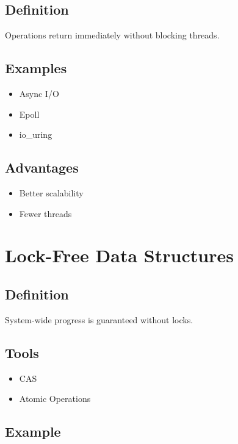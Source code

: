 \subsection{Definition}

Operations return immediately without blocking threads.

\subsection{Examples}

\begin{itemize}
\item Async I/O
\item Epoll
\item io\_uring
\end{itemize}

\subsection{Advantages}

\begin{itemize}
\item Better scalability
\item Fewer threads
\end{itemize}

\section{Lock-Free Data Structures}

\subsection{Definition}

System-wide progress is guaranteed without locks.

\subsection{Tools}

\begin{itemize}
\item CAS
\item Atomic Operations
\end{itemize}

\subsection{Example}

